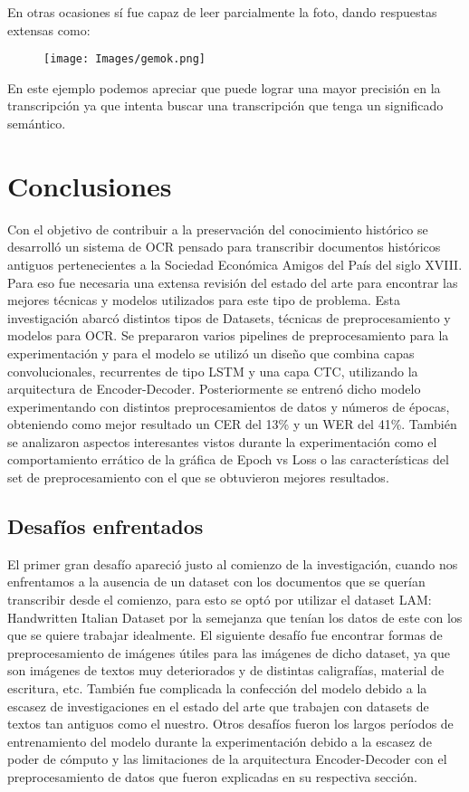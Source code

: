 \documentclass{article}
\begin{document}
En otras ocasiones sí fue capaz de leer parcialmente la foto, dando respuestas extensas como:
\begin{figure}[H]
    \centering
    \texttt{[image: Images/gemok.png]}
    \label{fig:enter-label}
\end{figure}
En este ejemplo podemos apreciar que puede lograr una mayor precisión en la transcripción ya que intenta buscar una transcripción que tenga un significado semántico.





\newpage
\section{Conclusiones}

Con el objetivo de contribuir a la preservación del conocimiento histórico se desarrolló un sistema de OCR pensado para transcribir documentos históricos antiguos pertenecientes a la Sociedad Económica Amigos del País del siglo XVIII. Para eso fue necesaria una extensa revisión del estado del arte para encontrar las mejores técnicas y modelos utilizados para este tipo de problema. Esta investigación abarcó distintos tipos de Datasets, técnicas de preprocesamiento y modelos para OCR. Se prepararon varios pipelines de preprocesamiento para la experimentación y para el modelo se utilizó un diseño que combina capas convolucionales, recurrentes de tipo LSTM y una capa CTC, utilizando la arquitectura de Encoder-Decoder.  Posteriormente se entrenó dicho modelo experimentando con distintos preprocesamientos de datos y números de épocas, obteniendo como mejor resultado un CER del 13\% y un WER del 41\%. También se analizaron aspectos interesantes vistos durante la experimentación como el comportamiento errático de la gráfica de Epoch vs Loss o las características del set de preprocesamiento con el que se obtuvieron mejores resultados.

\subsection{Desafíos enfrentados}

El primer gran desafío apareció justo al comienzo de la investigación, cuando nos enfrentamos a la ausencia de un dataset con los documentos que se querían transcribir desde el comienzo, para esto se optó por utilizar el dataset LAM: Handwritten Italian Dataset \cite{17} por la semejanza que tenían los datos de este con los que se quiere trabajar idealmente. El siguiente desafío fue encontrar formas de preprocesamiento de imágenes útiles para las imágenes de dicho dataset, ya que son imágenes de textos muy deteriorados y de distintas caligrafías, material de escritura, etc. También fue complicada la confección del modelo debido a la escasez de investigaciones en el estado del arte que trabajen con datasets de textos tan antiguos como el nuestro. Otros desafíos fueron los largos períodos de entrenamiento del modelo durante la experimentación debido a la escasez de poder de cómputo y las limitaciones de la arquitectura Encoder-Decoder con el preprocesamiento de datos que fueron explicadas en su respectiva sección.
\end{document}
